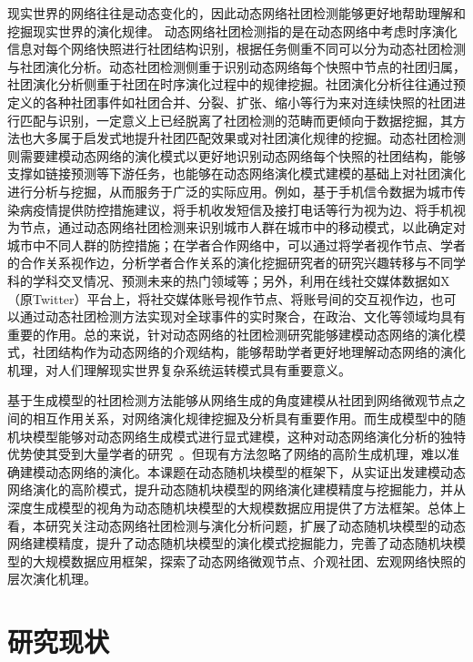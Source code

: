 现实世界的网络往往是动态变化的，因此动态网络社团检测能够更好地帮助理解和挖掘现实世界的演化规律。
动态网络社团检测指的是在动态网络中考虑时序演化信息对每个网络快照进行社团结构识别，根据任务侧重不同可以分为动态社团检测与社团演化分析。动态社团检测侧重于识别动态网络每个快照中节点的社团归属，社团演化分析侧重于社团在时序演化过程中的规律挖掘。社团演化分析往往通过预定义的各种社团事件如社团合并、分裂、扩张、缩小等行为\cite{palla2007quantifying}来对连续快照的社团进行匹配与识别，一定意义上已经脱离了社团检测的范畴而更倾向于数据挖掘，其方法也大多属于启发式地提升社团匹配效果或对社团演化规律的挖掘。动态社团检测则需要建模动态网络的演化模式以更好地识别动态网络每个快照的社团结构，能够支撑如链接预测等下游任务，也能够在动态网络演化模式建模的基础上对社团演化进行分析与挖掘，从而服务于广泛的实际应用\cite{farajtabar2017coevolve,kumar2024community}。例如，基于手机信令数据为城市传染病疫情提供防控措施建议\cite{he2024urban}，将手机收发短信及接打电话等行为视为边、将手机视为节点，通过动态网络社团检测来识别城市人群在城市中的移动模式，以此确定对城市中不同人群的防控措施；在学者合作网络中，可以通过将学者视作节点、学者的合作关系视作边，分析学者合作关系的演化挖掘研究者的研究兴趣转移与不同学科的学科交叉情况、预测未来的热门领域等\cite{wu2019large,wang2022weak}；另外，利用在线社交媒体数据如X（原Twitter）平台上，将社交媒体账号视作节点、将账号间的交互视作边，也可以通过动态社团检测方法实现对全球事件的实时聚合，在政治、文化等领域均具有重要的作用\cite{ma2024knowledge}。总的来说，针对动态网络的社团检测研究能够建模动态网络的演化模式，社团结构作为动态网络的介观结构，能够帮助学者更好地理解动态网络的演化机理，对人们理解现实世界复杂系统运转模式具有重要意义。

基于生成模型的社团检测方法能够从网络生成的角度建模从社团到网络微观节点之间的相互作用关系，对网络演化规律挖掘及分析具有重要作用。而生成模型中的随机块模型能够对动态网络生成模式进行显式建模，这种对动态网络演化分析的独特优势使其受到大量学者的研究~\cite{jin2021survey}。但现有方法忽略了网络的高阶生成机理，难以准确建模动态网络的演化。本课题在动态随机块模型的框架下，从实证出发建模动态网络演化的高阶模式，提升动态随机块模型的网络演化建模精度与挖掘能力，并从深度生成模型的视角为动态随机块模型的大规模数据应用提供了方法框架。总体上看，本研究关注动态网络社团检测与演化分析问题，扩展了动态随机块模型的动态网络建模精度，提升了动态随机块模型的演化模式挖掘能力，完善了动态随机块模型的大规模数据应用框架，探索了动态网络微观节点、介观社团、宏观网络快照的层次演化机理。





\section{研究现状}

